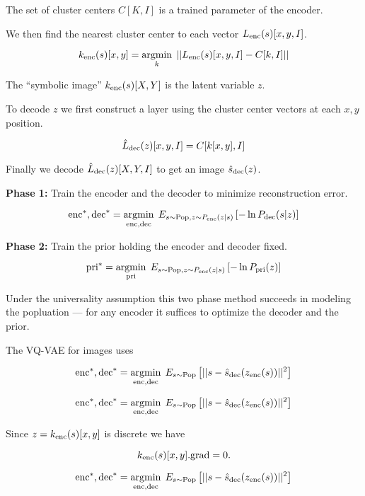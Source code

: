 {\vfill
The set of cluster centers $C[K,I]$ is a trained parameter of the encoder.


We then find the nearest cluster center to each vector $L_{\mathrm{enc}}(s)[x,y,I]$.

\vfill
$$k_{\mathrm{enc}}(s)[x,y] = \operatorname*{argmin}_k \;||L_{\mathrm{enc}}(s)[x,y,I] - C[k,I]||$$

\vfill
The ``symbolic image'' $k_{\mathrm{enc}}(s)[X,Y]$ is the latent variable $z$.


To decode $z$ we first construct a layer using the cluster center vectors at each $x,y$ position.

$$\hat{L}_{\mathrm{dec}}(z)[x,y,I] = C[k[x,y],I]$$

\vfill
Finally we decode $\hat{L}_{\mathrm{dec}}(z)[X,Y,I]$ to get an image $\hat{s}_{\mathrm{dec}}(z)$.


{\huge
{\bf Phase 1:} Train the encoder and the decoder to minimize reconstruction error.

$$\mathrm{enc}^*,\mathrm{dec}^* = \operatorname*{argmin}_{\mathrm{enc},\mathrm{dec}}\;E_{s \sim \mathrm{Pop},z \sim P_{\mathrm{enc}}(z|s)}\left[-\ln P_{\mathrm{dec}}(s|z)\right]$$


\vfill
{\bf Phase 2:} Train the prior holding the encoder and decoder fixed.

$$\mathrm{pri}^*   =  \operatorname*{argmin}_{\mathrm{pri}}\;E_{s\sim \mathrm{Pop},z\sim P_{\mathrm{enc}}(z|s)}\left[-\ln P_{\mathrm{pri}}(z)\right]$$

\vfill
Under the universality assumption this two phase method succeeds in modeling the popluation ---
for any encoder it suffices to optimize the decoder and the prior.



The VQ-VAE for images uses

\vfill
$$\mathrm{enc}^*,\mathrm{dec}^* = \operatorname*{argmin}_{\mathrm{enc},\mathrm{dec}}\;E_{s \sim \mathrm{Pop}}\left[||s - \hat{s}_{\mathrm{dec}}(z_{\mathrm{enc}}(s))||^2\right]$$


$$\mathrm{enc}^*,\mathrm{dec}^* = \operatorname*{argmin}_{\mathrm{enc},\mathrm{dec}}\;E_{s \sim \mathrm{Pop}}\left[||s - \hat{s}_{\mathrm{dec}}(z_{\mathrm{enc}}(s))||^2\right]$$

\vfill
Since $z = k_{\mathrm{enc}}(s)[x,y]$ is discrete we have

\vfill
$$k_{\mathrm{enc}}(s)[x,y].\mathrm{grad} = 0.$$


$$\mathrm{enc}^*,\mathrm{dec}^* = \operatorname*{argmin}_{\mathrm{enc},\mathrm{dec}}\;E_{s \sim \mathrm{Pop}}\left[||s - \hat{s}_{\mathrm{dec}}(z_{\mathrm{enc}}(s))||^2\right]$$

}}
